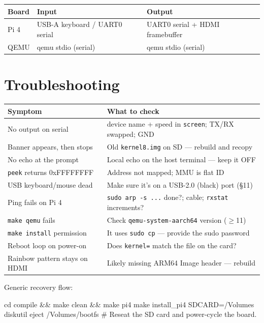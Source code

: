 \documentclass[a4paper,11pt]{article}
\begin{document}
\begin{center}\footnotesize
\begin{tabular}{@{}l l l@{}}
\toprule
\textbf{Board} & \textbf{Input} & \textbf{Output}\\
\midrule
Pi 4  & USB-A keyboard / UART0 serial & UART0 serial + HDMI framebuffer\\
QEMU  & qemu stdio (serial)          & qemu stdio (serial)\\
\bottomrule
\end{tabular}
\end{center}

\section{Troubleshooting}
\begin{center}\footnotesize
\begin{tabular}{@{}p{5.2cm} p{8.2cm}@{}}
\toprule
\textbf{Symptom} & \textbf{What to check}\\
\midrule
No output on serial            & device name + speed in \verb|screen|; TX/RX swapped; GND\\
Banner appears, then stops     & Old \verb|kernel8.img| on SD --- rebuild and recopy\\
No echo at the prompt          & Local echo on the host terminal --- keep it OFF\\
\verb|peek| returns 0xFFFFFFFF  & Address not mapped; MMU is flat ID\\
USB keyboard/mouse dead        & Make sure it's on a USB-2.0 (black) port (§11)\\
Ping fails on Pi 4             & \verb|sudo arp -s ...| done?; cable; \verb|rxstat| increments?\\
\verb|make qemu| fails          & Check \verb|qemu-system-aarch64| version ($\geq$11)\\
\verb|make install| permission  & It uses \verb|sudo cp| --- provide the sudo password\\
Reboot loop on power-on        & Does \verb|kernel=| match the file on the card?\\
Rainbow pattern stays on HDMI  & Likely missing ARM64 Image header --- rebuild\\
\bottomrule
\end{tabular}
\end{center}
Generic recovery flow:
\begin{code}
cd compile && make clean && make pi4
make install_pi4 SDCARD=/Volumes
diskutil eject /Volumes/bootfs
# Reseat the SD card and power-cycle the board.
\end{code}
\end{document}
